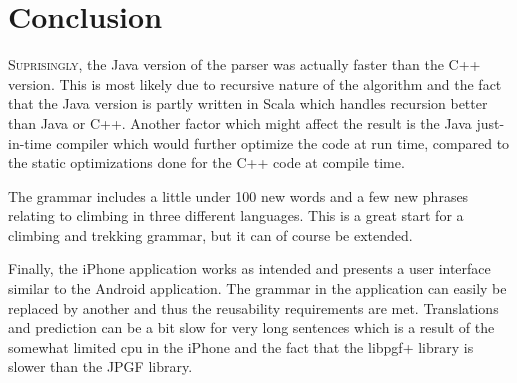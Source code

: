 \chapter{Conclusion}
\lettrine[lines=4, loversize=-0.1, lraise=0.1]{S}{uprisingly}, the Java version of the parser was actually faster than the C++ version. This is most likely due to recursive nature of the algorithm and the fact that the Java version is partly written in Scala which handles recursion better than Java or C++. Another factor which might affect the result is the Java just-in-time compiler which would further optimize the code at run time, compared to the static optimizations done for the C++ code at compile time.

The grammar includes a little under 100 new words and a few new phrases relating to climbing in three different languages. This is a great start for a climbing and trekking grammar, but it can of course be extended.

Finally, the iPhone application works as intended and presents a user interface similar to the Android application. The grammar in the application can easily be replaced by another and thus the reusability requirements are met. Translations and prediction can be a bit slow for very long sentences which is a result of the somewhat limited cpu in the iPhone and the fact that the libpgf+ library is slower than the JPGF library.
